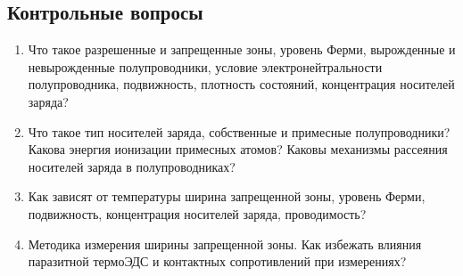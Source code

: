 \subsection*{Контрольные вопросы}
\begin{enumerate}
	\item Что такое разрешенные и запрещенные зоны, уровень Ферми, вырожденные и невырожденные полупроводники, условие
	электронейтральности полупроводника, подвижность, плотность состояний, концентрация носителей заряда? 
	\item Что такое тип носителей заряда, собственные и примесные полупроводники? Какова энергия ионизации примесных атомов? Каковы механизмы
	рассеяния носителей заряда в полупроводниках? 
	\item Как зависят от температуры ширина запрещенной зоны, уровень Ферми, подвижность, концентрация носителей заряда, проводимость? 
	\item Методика измерения ширины запрещенной зоны. Как избежать влияния паразитной термоЭДС и контактных сопротивлений при измерениях? 
\end{enumerate}




